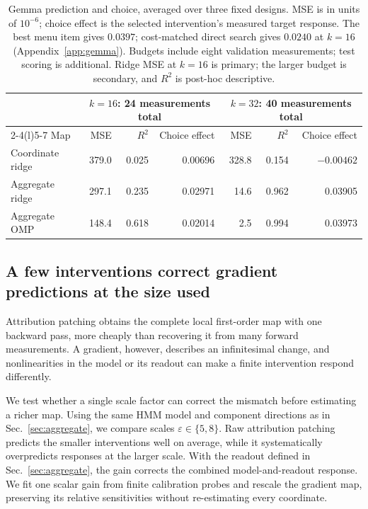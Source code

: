 \documentclass[sigconf,10pt,nonacm,balance=false]{acmart}
\newcommand{\eps}{\varepsilon}
\begin{document}
\begin{table}[t]
\centering
\begin{tabular}{@{}lrrrrrr@{}}
\toprule
& \multicolumn{3}{c}{$k=16$: 24 measurements total} & \multicolumn{3}{c}{$k=32$: 40 measurements total} \\
\cmidrule(lr){2-4}\cmidrule(l){5-7}
Map & MSE & $R^2$ & Choice effect & MSE & $R^2$ & Choice effect \\
\midrule
Coordinate ridge & 379.0 & 0.025 & 0.00696 & 328.8 & 0.154 & $-0.00462$ \\
Aggregate ridge & 297.1 & 0.235 & 0.02971 & 14.6 & 0.962 & 0.03905 \\
Aggregate OMP & 148.4 & 0.618 & 0.02014 & 2.5 & 0.994 & 0.03973 \\
\bottomrule
\end{tabular}
\caption{Gemma prediction and choice, averaged over three fixed designs. MSE is in units of $10^{-6}$; choice effect is the selected intervention's measured target response. The best menu item gives $0.0397$; cost-matched direct search gives $0.0240$ at $k=16$ (Appendix~\ref{app:gemma}). Budgets include eight validation measurements; test scoring is additional. Ridge MSE at $k=16$ is primary; the larger budget is secondary, and $R^2$ is post-hoc descriptive.}
\label{tab:gemma-main}
\end{table}

\subsection{A few interventions correct gradient predictions at the size used}\label{sec:step0}

Attribution patching obtains the complete local first-order map with one backward pass, more cheaply than recovering it from many forward measurements. A gradient, however, describes an infinitesimal change, and nonlinearities in the model or its readout can make a finite intervention respond differently.

We test whether a single scale factor can correct the mismatch before estimating a richer map. Using the same HMM model and component directions as in Sec.~\ref{sec:aggregate}, we compare scales $\eps\in\{5,8\}$. Raw attribution patching predicts the smaller interventions well on average, while it systematically overpredicts responses at the larger scale. With the readout defined in Sec.~\ref{sec:aggregate}, the gain corrects the combined model-and-readout response. We fit one scalar gain from finite calibration probes and rescale the gradient map, preserving its relative sensitivities without re-estimating every coordinate.
\end{document}
